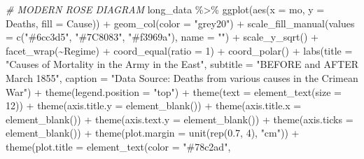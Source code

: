 \documentclass[
  dvipsnames]{article}
\newenvironment{Shaded}{\begin{snugshade}}{\end{snugshade}}
\newcommand{\AttributeTok}[1]{\textcolor[rgb]{0.77,0.63,0.00}{#1}}
\newcommand{\CommentTok}[1]{\textcolor[rgb]{0.56,0.35,0.01}{\textit{#1}}}
\newcommand{\DecValTok}[1]{\textcolor[rgb]{0.00,0.00,0.81}{#1}}
\newcommand{\FloatTok}[1]{\textcolor[rgb]{0.00,0.00,0.81}{#1}}
\newcommand{\FunctionTok}[1]{\textcolor[rgb]{0.00,0.00,0.00}{#1}}
\newcommand{\NormalTok}[1]{#1}
\newcommand{\SpecialCharTok}[1]{\textcolor[rgb]{0.00,0.00,0.00}{#1}}
\newcommand{\StringTok}[1]{\textcolor[rgb]{0.31,0.60,0.02}{#1}}
\begin{document}
\begin{Shaded}
\begin{Highlighting}[]
\CommentTok{\# MODERN ROSE DIAGRAM}
\NormalTok{long\_data }\SpecialCharTok{\%\textgreater{}\%}
    \FunctionTok{ggplot}\NormalTok{(}\FunctionTok{aes}\NormalTok{(}\AttributeTok{x =}\NormalTok{ mo, }\AttributeTok{y =}\NormalTok{ Deaths, }\AttributeTok{fill =}\NormalTok{ Cause)) }\SpecialCharTok{+}
    \FunctionTok{geom\_col}\NormalTok{(}\AttributeTok{color =} \StringTok{"grey20"}\NormalTok{) }\SpecialCharTok{+} \FunctionTok{scale\_fill\_manual}\NormalTok{(}\AttributeTok{values =} \FunctionTok{c}\NormalTok{(}\StringTok{"\#6cc3d5"}\NormalTok{,}
    \StringTok{"\#7C8083"}\NormalTok{, }\StringTok{"\#f3969a"}\NormalTok{), }\AttributeTok{name =} \StringTok{""}\NormalTok{) }\SpecialCharTok{+} \FunctionTok{scale\_y\_sqrt}\NormalTok{() }\SpecialCharTok{+}
    \FunctionTok{facet\_wrap}\NormalTok{(}\SpecialCharTok{\textasciitilde{}}\NormalTok{Regime) }\SpecialCharTok{+} \FunctionTok{coord\_equal}\NormalTok{(}\AttributeTok{ratio =} \DecValTok{1}\NormalTok{) }\SpecialCharTok{+}
    \FunctionTok{coord\_polar}\NormalTok{() }\SpecialCharTok{+} \FunctionTok{labs}\NormalTok{(}\AttributeTok{title =} \StringTok{"Causes of Mortality in the Army in the East"}\NormalTok{,}
    \AttributeTok{subtitle =} \StringTok{"BEFORE and AFTER March 1855"}\NormalTok{, }\AttributeTok{caption =} \StringTok{"Data Source: Deaths from various causes in the Crimean War"}\NormalTok{) }\SpecialCharTok{+}
    \FunctionTok{theme}\NormalTok{(}\AttributeTok{legend.position =} \StringTok{"top"}\NormalTok{) }\SpecialCharTok{+} \FunctionTok{theme}\NormalTok{(}\AttributeTok{text =} \FunctionTok{element\_text}\NormalTok{(}\AttributeTok{size =} \DecValTok{12}\NormalTok{)) }\SpecialCharTok{+}
    \FunctionTok{theme}\NormalTok{(}\AttributeTok{axis.title.y =} \FunctionTok{element\_blank}\NormalTok{()) }\SpecialCharTok{+} \FunctionTok{theme}\NormalTok{(}\AttributeTok{axis.title.x =} \FunctionTok{element\_blank}\NormalTok{()) }\SpecialCharTok{+}
    \FunctionTok{theme}\NormalTok{(}\AttributeTok{axis.text.y =} \FunctionTok{element\_blank}\NormalTok{()) }\SpecialCharTok{+} \FunctionTok{theme}\NormalTok{(}\AttributeTok{axis.ticks =} \FunctionTok{element\_blank}\NormalTok{()) }\SpecialCharTok{+}
    \FunctionTok{theme}\NormalTok{(}\AttributeTok{plot.margin =} \FunctionTok{unit}\NormalTok{(}\FunctionTok{rep}\NormalTok{(}\FloatTok{0.7}\NormalTok{, }\DecValTok{4}\NormalTok{), }\StringTok{"cm"}\NormalTok{)) }\SpecialCharTok{+}
    \FunctionTok{theme}\NormalTok{(}\AttributeTok{plot.title =} \FunctionTok{element\_text}\NormalTok{(}\AttributeTok{color =} \StringTok{"\#78c2ad"}\NormalTok{,}

\end{Highlighting}
\end{Shaded}
\end{document}
